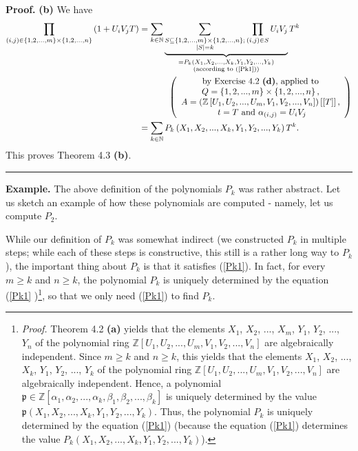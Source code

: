 \documentclass[numbers=enddot,12pt,final,onecolumn,notitlepage]{scrartcl}%
\newenvironment{proof}[1][Proof]{\noindent\textbf{#1.} }{\ \rule{0.5em}{0.5em}}
\begin{document}
\begin{proof}
\textbf{(b)} We have%
\begin{align*}
\prod_{\left(  i,j\right)  \in\left\{  1,2,...,m\right\}  \times\left\{
1,2,...,n\right\}  }\left(  1+U_{i}V_{j}T\right)   &  =\sum_{k\in\mathbb{N}%
}\underbrace{\sum_{\substack{S\subseteq\left\{  1,2,...,m\right\}
\times\left\{  1,2,...,n\right\}  ;\\\left\vert S\right\vert =k}%
}\prod_{\left(  i,j\right)  \in S}U_{i}V_{j}}_{\substack{=P_{k}\left(
X_{1},X_{2},...,X_{k},Y_{1},Y_{2},...,Y_{k}\right)  \\\text{(according to
(\ref{Pk1}))}}}T^{k}\\
&  \ \ \ \ \ \ \ \ \ \ \left(
\begin{array}
[c]{c}%
\text{by Exercise 4.2 \textbf{(d)}, applied to}\\
Q=\left\{  1,2,...,m\right\}  \times\left\{  1,2,...,n\right\}  \text{,}\\
A=\left(  \mathbb{Z}\left[  U_{1},U_{2},...,U_{m},V_{1},V_{2},...,V_{n}%
\right]  \right)  \left[  \left[  T\right]  \right]  \text{,}\\
\text{ }t=T\text{ and }\alpha_{\left(  i,j\right)  }=U_{i}V_{j}%
\end{array}
\right) \\
&  =\sum_{k\in\mathbb{N}}P_{k}\left(  X_{1},X_{2},...,X_{k},Y_{1}%
,Y_{2},...,Y_{k}\right)  T^{k}.
\end{align*}
This proves Theorem 4.3 \textbf{(b)}.
\end{proof}

\textbf{Example.} The above definition of the polynomials $P_{k}$ was rather
abstract. Let us sketch an example of how these polynomials are computed -
namely, let us compute $P_{2}$.

While our definition of $P_{k}$ was somewhat indirect (we constructed $P_{k}$
in multiple steps; while each of these steps is constructive, this still is a
rather long way to $P_{k}$), the important thing about $P_{k}$ is that it
satisfies (\ref{Pk1}). In fact, for every $m\geq k$ and $n\geq k$, the
polynomial $P_{k}$ is uniquely determined by the equation (\ref{Pk1}%
)\footnote{\textit{Proof.} Theorem 4.2 \textbf{(a)} yields that the elements
$X_{1}$, $X_{2}$, $...$, $X_{m}$, $Y_{1}$, $Y_{2}$, $...$, $Y_{n}$ of the
polynomial ring $\mathbb{Z}\left[  U_{1},U_{2},...,U_{m},V_{1},V_{2}%
,...,V_{n}\right]  $ are algebraically independent. Since $m\geq k$ and $n\geq
k$, this yields that the elements $X_{1}$, $X_{2}$, $...$, $X_{k}$, $Y_{1}$,
$Y_{2}$, $...$, $Y_{k}$ of the polynomial ring $\mathbb{Z}\left[  U_{1}%
,U_{2},...,U_{m},V_{1},V_{2},...,V_{n}\right]  $ are algebraically
independent. Hence, a polynomial $\mathfrak{p}\in\mathbb{Z}\left[  \alpha
_{1},\alpha_{2},...,\alpha_{k},\beta_{1},\beta_{2},...,\beta_{k}\right]  $ is
uniquely determined by the value $\mathfrak{p}\left(  X_{1},X_{2}%
,...,X_{k},Y_{1},Y_{2},...,Y_{k}\right)  $. Thus, the polynomial $P_{k}$ is
uniquely determined by the equation (\ref{Pk1}) (because the equation
(\ref{Pk1}) determines the value $P_{k}\left(  X_{1},X_{2},...,X_{k}%
,Y_{1},Y_{2},...,Y_{k}\right)  $).}, so that we only need (\ref{Pk1}) to find
$P_{k}$.
\end{document}
